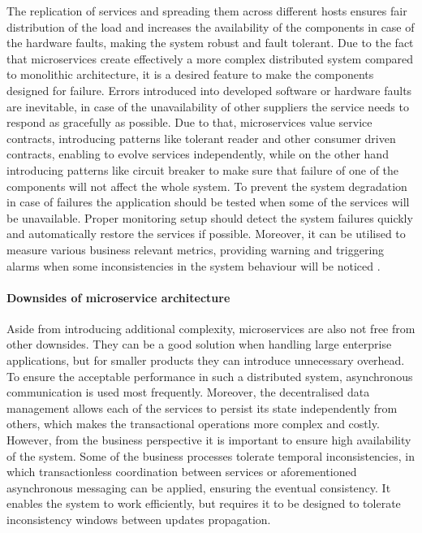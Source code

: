The replication of services and spreading them across different hosts ensures fair distribution of the load and increases the availability of the components in case of the hardware faults, making the system robust and fault tolerant. Due to the fact that microservices create effectively a more complex distributed system compared to monolithic architecture, it is a desired feature to make the components designed for failure. Errors introduced into developed software or hardware faults are inevitable, in case of the unavailability of other suppliers the service needs to respond as gracefully as possible. Due to that, microservices value service contracts, introducing patterns like tolerant reader and other consumer driven contracts, enabling to evolve services independently, while on the other hand introducing patterns like circuit breaker to make sure that failure of one of the components will not affect the whole system. To prevent the system degradation in case of failures the application should be tested when some of the services will be unavailable. Proper monitoring setup should detect the system failures quickly and automatically restore the services if possible. Moreover, it can be utilised to measure various business relevant metrics, providing warning and triggering alarms when some inconsistencies in the system behaviour will be noticed \cite{MicroservicesHowToMakeYourApplicationScale}.

\paragraph{Downsides of microservice architecture}

Aside from introducing additional complexity, microservices are also not free from other downsides. They can be a good solution when handling large enterprise applications, but for smaller products they can introduce unnecessary overhead. To ensure the acceptable performance in such a distributed system, asynchronous communication is used most frequently. Moreover, the decentralised data management allows each of the services to persist its state independently from others, which makes the transactional operations more complex and costly. However, from the business perspective it is important to ensure high availability of the system. Some of the business processes tolerate temporal inconsistencies, in which transactionless coordination between services or aforementioned asynchronous messaging can be applied, ensuring the eventual consistency. It enables the system to work efficiently, but requires it to be designed to tolerate inconsistency windows between updates propagation.

